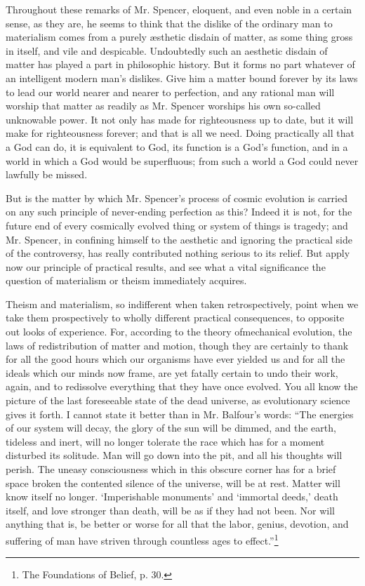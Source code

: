 \documentclass[]{article}
\begin{document}
Throughout these remarks of Mr. Spencer, eloquent, and even noble in a certain sense, as they are, he seems to think that the dislike of the ordinary man to materialism comes from a purely {\ae}sthetic disdain of matter, as some thing gross in itself, and vile and despicable. Undoubtedly such an aesthetic disdain of matter has played a part in philosophic history. But it forms no part whatever of an intelligent modern man's dislikes. Give him a matter bound forever by its laws to lead our world nearer and nearer to perfection, and any rational man will worship that matter as readily as Mr. Spencer worships his own so-called unknowable power. It not only has made for righteousness up to date, but it will make for righteousness forever; and that is all we need. Doing practically all that a God can do, it is equivalent to God, its function is a God's function, and in a world in which a God would be superfluous; from such a world a God could never lawfully be missed. 

But is the matter by which Mr. Spencer's process of cosmic evolution is carried on any such principle of never-ending perfection as this? Indeed it is not, for the future end of every cosmically evolved thing or system of things is tragedy; and Mr. Spencer, in confining himself to the aesthetic and ignoring the practical side of the controversy, has really contributed nothing serious to its relief. But apply now our principle of practical results, and see what a vital significance the question of materialism or theism immediately acquires. 

Theism and materialism, so indifferent when taken retrospectively, point when we take them prospectively to wholly different practical consequences, to opposite out looks of experience. For, according to the theory ofmechanical evolution, the laws of redistribution of matter and motion, though they are certainly to thank for all the good hours which our organisms have ever yielded us and for all the ideals which our minds now frame, are yet fatally certain to undo their work, again, and to redissolve everything that they have once evolved. You all know the picture of the last foreseeable state of the dead universe, as evolutionary science gives it forth. I cannot state it better than in Mr. Balfour's words: ``The energies of our system will decay, the glory of the sun will be dimmed, and the earth, tideless and inert, will no longer tolerate the race which has for a moment disturbed its solitude. Man will go down into the pit, and all his thoughts will perish. The uneasy consciousness which in this obscure corner has for a brief space broken the contented silence of the universe, will be at rest. Matter will know itself no longer. `Imperishable monuments' and `immortal deeds,' death itself, and love stronger than death, will be as if they had not been. Nor will anything that is, be better or worse for all that the labor, genius, devotion, and suffering of man have striven through countless ages to effect.''\footnote{The Foundations of Belief, p. 30.}
\end{document}
